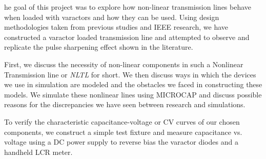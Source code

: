 \documentclass[journal]{IEEEtran} \usepackage[english]{babel}
\begin{document}

he goal of this project was to explore how non-linear
transmission lines behave when loaded with varactors and how they can be used.
Using design methodologies taken from previous studies and IEEE research, we
have constructed a varactor loaded transmission line and attempted to observe
and replicate the pulse sharpening effect shown in the literature.

First, we discuss the necessity of non-linear components in such a Nonlinear
Transmission line or \emph{NLTL} for short. We then discuss ways in which the
devices we use in simulation are modeled and the obstacles we faced in
constructing these models. We simulate these nonlinear lines using MICROCAP and
discuss possible reasons for the discrepancies we have seen between research and
simulations.

To verify the characteristic capacitance-voltage or CV curves of our chosen
components, we construct a simple test fixture and measure capacitance vs.
voltage using a DC power supply to reverse bias the varactor diodes and a
handheld LCR meter.



\hfill 



%
%
\end{document}
